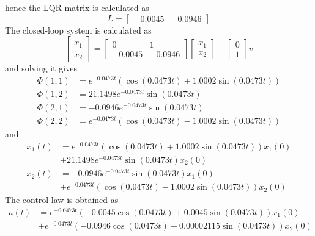 hence the LQR matrix is calculated as
\begin{equation}
    L=\begin{bmatrix}
        -0.0045&   -0.0946
    \end{bmatrix}
\end{equation}
The closed-loop system is calculated as
\begin{equation}
    \begin{bmatrix}
        \dot{x}_1\\\dot{x}_2
    \end{bmatrix}=\begin{bmatrix}
        0& 1\\ -0.0045&   -0.0946
    \end{bmatrix}\begin{bmatrix}
        x_1\\x_2
    \end{bmatrix}+\begin{bmatrix}
        0\\1
    \end{bmatrix}v
\end{equation}
and solving it gives
\begin{equation}
\begin{split}
    \Phi(1,1)&=e^{-0.0473t}(\cos(0.0473t)+1.0002\sin(0.0473t))\\
    \Phi(1,2)&=21.1498e^{-0.0473t}\sin(0.0473t)\\
    \Phi(2,1)&=-0.0946e^{-0.0473t}\sin(0.0473t)\\
    \Phi(2,2)&=e^{-0.0473t}(\cos(0.0473t)-1.0002\sin(0.0473t))
\end{split}
\end{equation}
and 
\begin{equation}
\begin{split}
    x_1(t)&=e^{-0.0473t}(\cos(0.0473t)+1.0002\sin(0.0473t))x_1(0)\\
    &+21.1498e^{-0.0473t}\sin(0.0473t)x_2(0)\\
    x_2(t)&=-0.0946e^{-0.0473t}\sin(0.0473t)x_1(0)\\
    &+e^{-0.0473t}(\cos(0.0473t)-1.0002\sin(0.0473t))x_2(0)
\end{split}
\end{equation}
The control law is obtained as
\begin{equation}
\begin{split}
    u(t)&=e^{-0.0473t}(-0.0045\cos(0.0473t)+0.0045\sin(0.0473t))x_1(0)\\
    &+e^{-0.0473t}(-0.0946\cos(0.0473t)+0.00002115\sin(0.0473t))x_2(0)
\end{split}
\end{equation}
